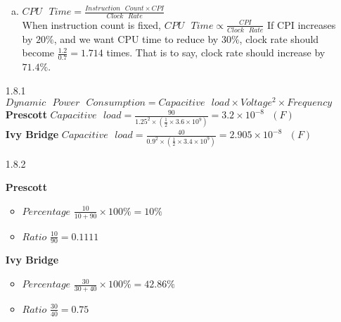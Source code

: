 \documentclass[12pt, a4paper]{article}
\begin{document}
\begin{itemize}[font=\bfseries]
\begin{enumerate}[a.]
\item
$CPU\mbox{ }Time = \frac{Instruction\mbox{ }Count \times CPI}{Clock\mbox{ }Rate}$ \\
When instruction count is fixed, $CPU\mbox{ }Time \propto \frac{CPI}{Clock\mbox{ }Rate}$ 
If CPI increases by $20\%$, and we want CPU time to reduce by $30\%$, clock rate should become $\frac{1.2}{0.7} = 1.714$ times. That is to say, clock rate should increase by $71.4\%$.

\end{enumerate} 

\item[1.8.1]
$Dynamic\mbox{ }Power\mbox{ }Consumption = Capacitive\mbox{ }load \times Voltage^2 \times Frequency$
{\bf Prescott} \hspace{0.2cm} $Capacitive\mbox{ }load = \frac{90}{1.25^2 \times (\frac{1}{2} \times 3.6 \times 10^9)} = 3.2 \times 10^{-8}\mbox{ }(F)$ \\
{\bf Ivy Bridge} \hspace{0.2cm} $Capacitive\mbox{ }load = \frac{40}{0.9^2 \times (\frac{1}{2} \times 3.4 \times 10^9)} = 2.905 \times 10^{-8}\mbox{ }(F)$ \\

\item[1.8.2] 

{\bf Prescott}
\begin{itemize}
\item $Percentage$ \hspace{0.2cm} $\frac{10}{10 + 90} \times 100\% = 10\%$
\item $Ratio$ \hspace{0.2cm} $\frac{10}{90} = 0.1111$ 
\end{itemize}

{\bf Ivy Bridge}
\begin{itemize}
\item $Percentage$ \hspace{0.2cm} $\frac{30}{30 + 40} \times 100\% = 42.86\%$
\item $Ratio$ \hspace{0.2cm} $\frac{30}{40} = 0.75$ 
\end{itemize}


\end{itemize}
\end{document}
